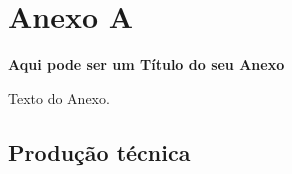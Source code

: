 \chapter{Anexo A}
\label{anex1}
\begin{center}
    \textbf{Aqui pode ser um Título do seu Anexo}
\end{center}

Texto do Anexo.


\section{Produção técnica}

